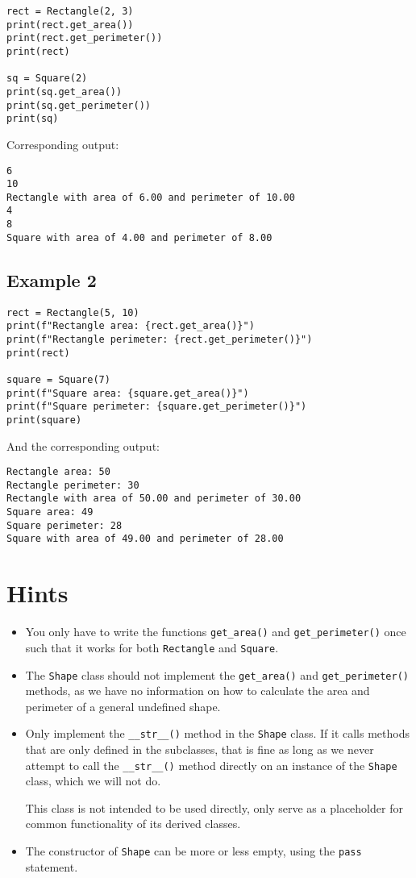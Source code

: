 \begin{verbatim}
rect = Rectangle(2, 3)
print(rect.get_area())
print(rect.get_perimeter())
print(rect)

sq = Square(2)
print(sq.get_area())
print(sq.get_perimeter())
print(sq)
\end{verbatim}

Corresponding output:
\begin{verbatim}
6
10
Rectangle with area of 6.00 and perimeter of 10.00
4
8
Square with area of 4.00 and perimeter of 8.00
\end{verbatim}

\subsection*{Example 2}

\begin{verbatim}
rect = Rectangle(5, 10)
print(f"Rectangle area: {rect.get_area()}")
print(f"Rectangle perimeter: {rect.get_perimeter()}")
print(rect)

square = Square(7)
print(f"Square area: {square.get_area()}")
print(f"Square perimeter: {square.get_perimeter()}")
print(square)
\end{verbatim}

And the corresponding output:
\begin{verbatim}
Rectangle area: 50
Rectangle perimeter: 30
Rectangle with area of 50.00 and perimeter of 30.00
Square area: 49
Square perimeter: 28
Square with area of 49.00 and perimeter of 28.00
\end{verbatim}

\section*{Hints}

\begin{itemize}
	\item
	You only have to write the functions
	\texttt{get\_area()} and \texttt{get\_perimeter()} once
	such that it works for both \texttt{Rectangle} and \texttt{Square}.

    \item
    The \texttt{Shape} class should not implement
	the \texttt{get\_area()} and \texttt{get\_perimeter()} methods,
	as we have no information on how to calculate the area and perimeter
	of a general undefined shape.

    \item
    Only implement the \texttt{\_\_str\_\_()} method
	in the \texttt{Shape} class.
	If it calls methods that are only defined in the subclasses,
	that is fine as long as we never attempt to call
	the \texttt{\_\_str\_\_()} method directly
	on an instance of the \texttt{Shape} class,
	which we will not do.

	This class is not intended to be used directly,
	only serve as a placeholder for common functionality
	of its derived classes.

    \item
    The constructor of \texttt{Shape} can be more or less empty,
	using the \texttt{pass} statement.
\end{itemize}


